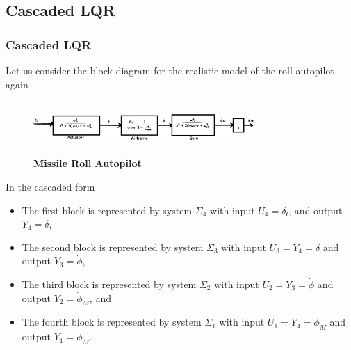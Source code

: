 \documentclass[10pt]{beamer}
\begin{document}
\subsection{Cascaded LQR}
\begin{frame}
\frametitle{Cascaded LQR}
Let us consider the block diagram for the realistic model of the roll autopilot again
\begin{figure}[h]
\begin{center}
\includegraphics[width=8.4cm,height=2.0cm]{BlockDiaLQRs14.eps}
\vspace{-0.2cm}
\caption{\bf{Missile Roll Autopilot}} \label{Cascade14}
\end{center}
\vspace{-0.5cm}
\end{figure}

In the cascaded form
\begin{itemize}
\item The first block is represented by system $\Sigma_4$ with input $U_4=\delta_C$ and output $Y_4=\delta$,
\item The second block is represented by system $\Sigma_3$ with input $U_3=Y_4=\delta$ and output $Y_3=\dot \phi$,
\item The third block is represented by system $\Sigma_2$ with input $U_2=Y_3=\dot \phi$ and output $Y_2=\dot \phi_M$, and
\item The fourth block is represented by system $\Sigma_1$ with input $U_1=Y_4=\dot \phi_M$ and output $Y_1=\phi_M$.
\end{itemize}
\vspace{.4cm}
\end{frame}
%
\end{document}
